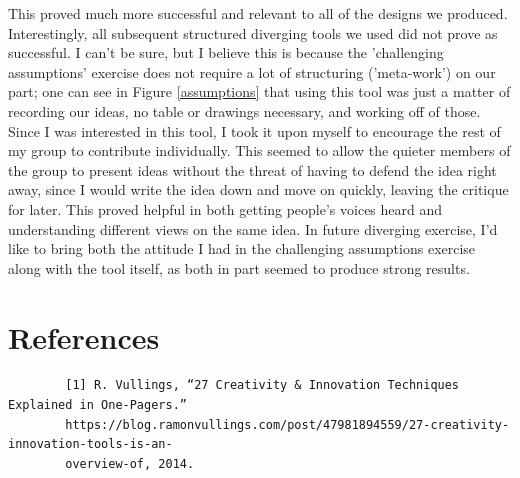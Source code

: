\documentclass[11pt]{article}
\begin{document}
    This proved much more successful and relevant to all of the designs we produced. Interestingly, all subsequent structured diverging tools we used did not prove as successful. I can't be sure, but I believe this is because the 'challenging assumptions' exercise does not require a lot of structuring ('meta-work') on our part; one can see in Figure \ref{assumptions} that using this tool was just a matter of recording our ideas, no table or drawings necessary, and working off of those. Since I was interested in this tool, I took it upon myself to encourage the rest of my group to contribute individually. This seemed to allow the quieter members of the group to present ideas without the threat of having to defend the idea right away, since I would write the idea down and move on quickly, leaving the critique for later. This proved helpful in both getting people's voices heard and understanding different views on the same idea. In future diverging exercise, I'd like to bring both the attitude I had in the challenging assumptions exercise along with the tool itself, as both in part seemed to produce strong results.


    \section{References}
    \begin{verbatim}
        [1] R. Vullings, “27 Creativity & Innovation Techniques Explained in One-Pagers.” 
        https://blog.ramonvullings.com/post/47981894559/27-creativity-innovation-tools-is-an-
        overview-of, 2014.
    \end{verbatim}
  
\end{document}
